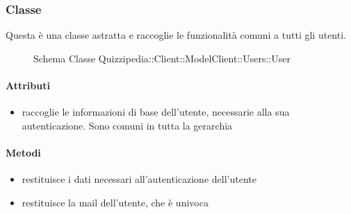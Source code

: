 \subsubsection{Classe }
Questa è una classe astratta e raccoglie le funzionalità comuni a tutti gli utenti.
\begin{figure}[H]
\centering
\noindent{}
\caption[Schema Classe User]{Schema Classe Quizzipedia::Client::ModelClient::Users::User}
\end{figure}
\paragraph{Attributi}
\begin{itemize}
\item {}
\newline
raccoglie le informazioni di base dell'utente, necessarie alla sua autenticazione. Sono comuni in tutta la gerarchia
\end{itemize}
\paragraph{Metodi}
\begin{itemize}
\item {}
\newline
restituisce i dati necessari all'autenticazione dell'utente
\newline
\item {}
\newline
restituisce la mail dell'utente, che è univoca
\newline
\end{itemize}

